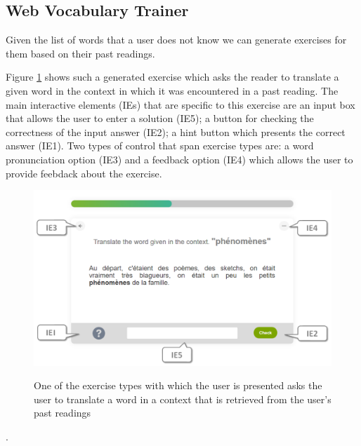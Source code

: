 
\newpage
\subsection{Web Vocabulary Trainer}

Given the list of words that a user does not know we can generate exercises for them based on their past readings.

Figure \ref{exercise_translate} shows such a generated exercise which asks the reader to translate a given word in the context in which it was encountered in a past reading. The main interactive elements (IEs) that are specific to this exercise are an input box that allows the user to enter a solution (IE5); a button for checking the correctness of the input answer (IE2); a hint button which presents the correct answer (IE1). Two types of control that span exercise types are: a word pronunciation option (IE3) and a feedback option (IE4) which allows the user to provide feebdack about the exercise.

\begin{figure}[h!]
\centering
  \includegraphics[width=0.9\columnwidth]{figures/exercise_translate}
  \caption{One of the exercise types with which the user is presented asks the user to translate a word in a context that is retrieved from the user's past readings}{
  \label{exercise_translate}
  }
\end{figure}

.

